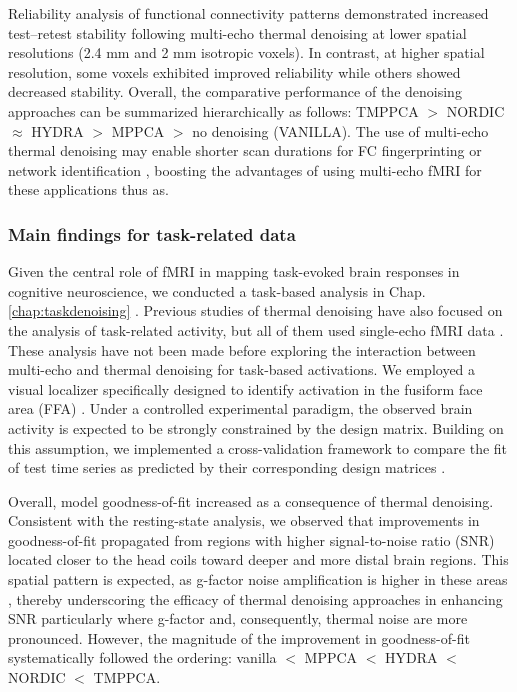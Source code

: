 Reliability analysis of functional connectivity patterns \citep{lynchRapidPrecisionFunctional2020} demonstrated increased test–retest stability following multi-echo thermal denoising at lower spatial resolutions (2.4 mm and 2 mm isotropic voxels). In contrast, at higher spatial resolution, some voxels exhibited improved reliability while others showed decreased stability. Overall, the comparative performance of the denoising approaches can be summarized hierarchically as follows: TMPPCA $>$ NORDIC $\approx$ HYDRA $>$ MPPCA $>$ no denoising (VANILLA).
The use of multi-echo thermal denoising may enable shorter scan durations for FC fingerprinting or network identification \citep{finnFunctionalConnectomeFingerprinting2015, foxSpontaneousFluctuationsBrain2007}, boosting the advantages of using multi-echo fMRI for these applications \citep{lynchRapidPrecisionFunctional2020} thus as.

\subsubsection{Main findings for task-related data}

Given the central role of fMRI in mapping task-evoked brain responses in cognitive neuroscience, we conducted a task-based analysis in Chap. \ref{chap:taskdenoising} \citep{bermanEvaluatingFunctionalLocalizers2010, saxeDivideConquerDefense2006}. Previous studies of thermal denoising have also focused on the analysis of task-related activity, but all of them used single-echo fMRI data \citep{vizioli2021lowering, dowdle2023evaluating, }. These analysis have not been made before exploring the interaction between multi-echo and thermal denoising for task-based activations.  We employed a visual localizer specifically designed to identify activation in the fusiform face area (FFA) \citep{lerma-usabiagaConvergingEvidenceFunctional2018}. Under a controlled experimental paradigm, the observed brain activity is expected to be strongly constrained by the design matrix. Building on this assumption, we implemented a cross-validation framework to compare the fit of test time series as predicted by their corresponding design matrices \citep{princeImprovingAccuracySingletrial2022, dowdle2023evaluating}. 

Overall, model goodness-of-fit increased as a consequence of thermal denoising. Consistent with the resting-state analysis, we observed that improvements in goodness-of-fit propagated from regions with higher signal-to-noise ratio (SNR) located closer to the head coils toward deeper and more distal brain regions. This spatial pattern is expected, as g-factor noise amplification is higher in these areas \citep{aja-fernandezNoiseEstimationParallel2014, pruessmann1999sense}, thereby underscoring the efficacy of thermal denoising approaches in enhancing SNR particularly where g-factor and, consequently, thermal noise are more pronounced. However, the magnitude of the improvement in goodness-of-fit systematically followed the ordering: vanilla $<$ MPPCA $<$ HYDRA $<$ NORDIC $<$ TMPPCA. 

